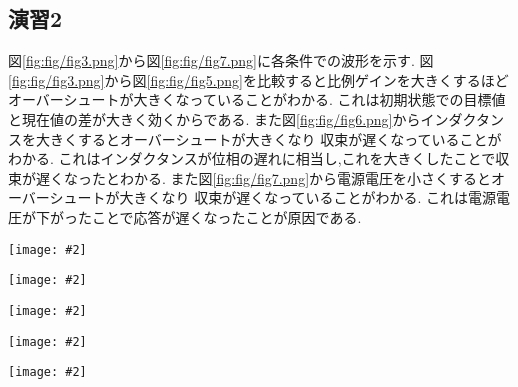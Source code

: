 \documentclass[uplatex,a4j,11pt,dvipdfmx]{jsarticle}
\makeatletter
\def\fgcaption{\def\@captype{figure}\caption}
\newcommand{\mfig}[3][width=15cm]{
\begin{center}
\texttt{[image: \#2]}
\fgcaption{#3 \label{fig:#2}}
\end{center}
}
\makeatother
\begin{document}
\subsection*{演習2}
図\ref{fig:fig/fig3.png}から図\ref{fig:fig/fig7.png}に各条件での波形を示す.
図\ref{fig:fig/fig3.png}から図\ref{fig:fig/fig5.png}を比較すると比例ゲインを大きくするほど
オーバーシュートが大きくなっていることがわかる.
これは初期状態での目標値と現在値の差が大きく効くからである.
また図\ref{fig:fig/fig6.png}からインダクタンスを大きくするとオーバーシュートが大きくなり
収束が遅くなっていることがわかる.
これはインダクタンスが位相の遅れに相当し,これを大きくしたことで収束が遅くなったとわかる.
また図\ref{fig:fig/fig7.png}から電源電圧を小さくするとオーバーシュートが大きくなり
収束が遅くなっていることがわかる.
これは電源電圧が下がったことで応答が遅くなったことが原因である.
\mfig[width=14cm]{fig/fig3.png}{条件1の波形}
\mfig[width=14cm]{fig/fig4.png}{条件2の波形}
\mfig[width=14cm]{fig/fig5.png}{条件3の波形}
\mfig[width=14cm]{fig/fig6.png}{条件4の波形}
\mfig[width=14cm]{fig/fig7.png}{条件5の波形}
\end{document}
